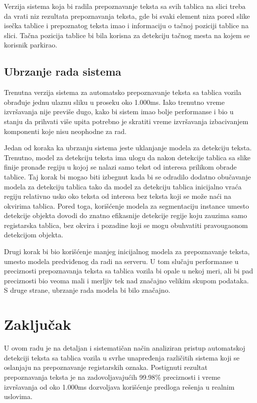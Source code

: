 \documentclass[a4paper,12pt]{article}
\begin{document}
	Verzija sistema koja bi radila prepoznavanje teksta sa svih tablica na slici treba da vrati niz rezultata prepoznavanja teksta, gde bi svaki element niza pored slike isečka tablice i prepoznatog teksta imao i informaciju o tačnoj poziciji tablice na slici. Tačna pozicija tablice bi bila korisna za detekciju tačnog mesta na kojem se korisnik parkirao.
	
	\subsection{Ubrzanje rada sistema}
	
	Trenutna verzija sistema za automatsko prepoznavanje teksta sa tablica vozila obrađuje jednu ulaznu sliku u proseku oko 1.000ms. Iako trenutno vreme izvršavanja nije previše dugo, kako bi sistem imao bolje performanse i bio u stanju da prihvati više upita potrebno je skratiti vreme izvršavanja izbacivanjem komponenti koje nisu neophodne za rad.
	
	Jedan od koraka ka ubrzanju sistema jeste uklanjanje modela za detekciju teksta. Trenutno, model za detekciju teksta ima ulogu da nakon detekcije tablica sa slike finije pronađe regiju u kojoj se nalazi samo tekst od interesa prilikom obrade tablice. Taj korak bi mogao biti izbegnut kada bi se odradilo dodatno obučavanje modela za detekciju tablica tako da model za detekciju tablica inicijalno vraća regiju relativno usko oko teksta od interesa bez teksta koji se može naći na okvirima tablica. Pored toga, korišćenje modela za segmentaciju instance umesto detekcije objekta dovodi do znatno efikasnije detekcije regije koju zauzima samo registarska tablica, bez okvira i pozadine koji se mogu obuhvatiti pravougaonom detekcijom objekta.
	
	Drugi korak bi bio korišćenje manjeg inicijalnog modela za prepoznavanje teksta, umesto modela predviđenog da radi na serveru. U tom slučaju performanse u preciznosti prepoznavanja teksta sa tablica vozila bi opale u nekoj meri, ali bi pad preciznosti bio veoma mali i merljiv tek nad značajno velikim skupom podataka. S druge strane, ubrzanje rada modela bi bilo značajno.
	\newpage
	
	\section{Zaključak}
	
	U ovom radu je na detaljan i sistematičan način analiziran pristup automatskoj detekciji teksta sa tablica vozila u svrhe unapređenja različitih sistema koji se oslanjaju na prepoznavanje registarskih oznaka. Postignuti rezultat prepoznavanja teksta je na zadovoljavajućih 99.98\% preciznosti i vreme izvršavanja od oko 1.000ms dozvoljava korišćenje predloga rešenja u realnim uslovima.
	
\end{document}
